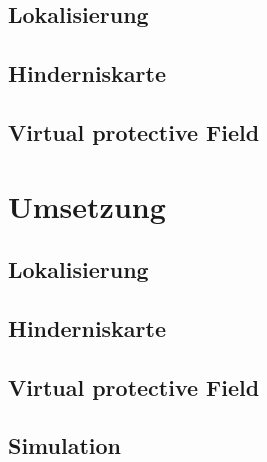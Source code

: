 \subsection{Lokalisierung}

\subsection{Hinderniskarte}

\subsection{Virtual protective Field}

\section{Umsetzung}
\label{lokalisierung_umsetzung_sec}
\authorsection{\editordummy}

\subsection{Lokalisierung}

\subsection{Hinderniskarte}

\subsection{Virtual protective Field}

\subsection{Simulation}
